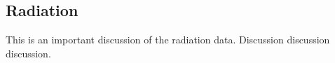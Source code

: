 \subsection{Radiation}
\label{sec:Radiation Results Discussion}
This is an important discussion of the radiation data.  Discussion discussion discussion.